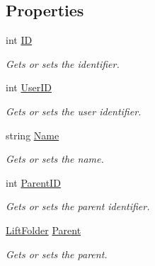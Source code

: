 \subsection*{Properties}
\begin{DoxyCompactItemize}
\item 
int \mbox{\hyperlink{class_bar_none_1_1_shared_1_1_domain_model_1_1_lift_folder_afb690f83f4382a3b00f86b270f6f8bfb}{ID}}
\begin{DoxyCompactList}\small\item\em Gets or sets the identifier. \end{DoxyCompactList}\item 
int \mbox{\hyperlink{class_bar_none_1_1_shared_1_1_domain_model_1_1_lift_folder_ac4be3e61c6d383a6b8adc1d50c1784da}{User\+ID}}
\begin{DoxyCompactList}\small\item\em Gets or sets the user identifier. \end{DoxyCompactList}\item 
string \mbox{\hyperlink{class_bar_none_1_1_shared_1_1_domain_model_1_1_lift_folder_ae87046d0cc252ed0ea71636892839c8d}{Name}}
\begin{DoxyCompactList}\small\item\em Gets or sets the name. \end{DoxyCompactList}\item 
int \mbox{\hyperlink{class_bar_none_1_1_shared_1_1_domain_model_1_1_lift_folder_ad70db894aeda87f01288210d8632dcad}{Parent\+ID}}
\begin{DoxyCompactList}\small\item\em Gets or sets the parent identifier. \end{DoxyCompactList}\item 
\mbox{\hyperlink{class_bar_none_1_1_shared_1_1_domain_model_1_1_lift_folder}{Lift\+Folder}} \mbox{\hyperlink{class_bar_none_1_1_shared_1_1_domain_model_1_1_lift_folder_a84812a80d8f9fb38b205e2694cf4ad8f}{Parent}}
\begin{DoxyCompactList}\small\item\em Gets or sets the parent. \end{DoxyCompactList}\item 

\end{DoxyCompactItemize}
